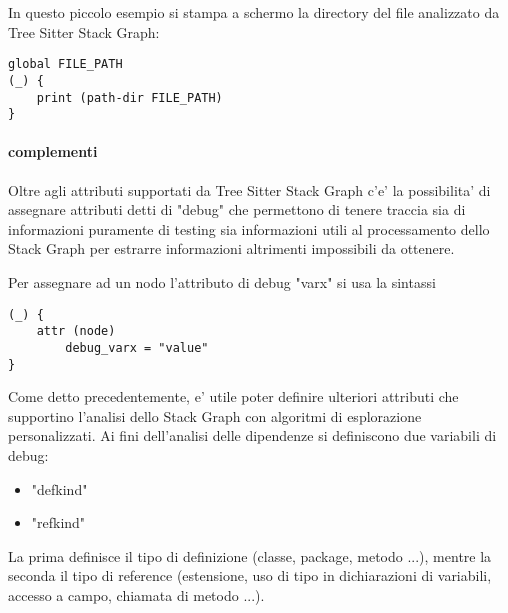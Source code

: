 In questo piccolo esempio si stampa a schermo la directory del file analizzato da Tree Sitter Stack Graph:

\begin{Verbatim}[samepage=true]
global FILE_PATH
(_) {
    print (path-dir FILE_PATH)
}
\end{Verbatim}

\paragraph{complementi}

Oltre agli attributi supportati da Tree Sitter Stack Graph c'e' la possibilita' di assegnare attributi detti di "debug" che permettono di tenere traccia sia di informazioni puramente di testing sia informazioni utili al processamento dello Stack Graph per estrarre informazioni altrimenti impossibili da ottenere.

Per assegnare ad un nodo l'attributo di debug "varx" si usa la sintassi

\begin{Verbatim}[samepage=true]
(_) {
    attr (node)
        debug_varx = "value"
}
\end{Verbatim}

Come detto precedentemente, e' utile poter definire ulteriori attributi che supportino l'analisi dello Stack Graph con algoritmi di esplorazione personalizzati.
Ai fini dell'analisi delle dipendenze si definiscono due variabili di debug:

\begin{itemize}
    \item "defkind"
    \item "refkind"
\end{itemize}

La prima definisce il tipo di definizione (classe, package, metodo ...), mentre la seconda il tipo di reference (estensione, uso di tipo in dichiarazioni di variabili, accesso a campo, chiamata di metodo ...).
